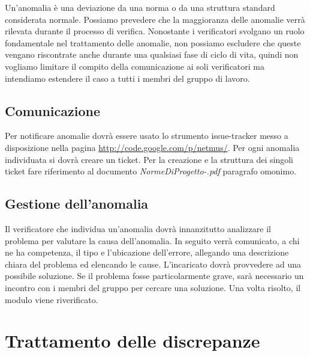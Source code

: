Un'anomalia \`e una deviazione da una norma o da una struttura standard
considerata normale. Possiamo prevedere che la maggioranza delle anomalie verr\`a 
rilevata durante il processo di verifica. Nonostante i verificatori svolgano un
ruolo fondamentale nel trattamento delle anomalie, non possiamo escludere che
queste vengano riscontrate anche durante una qualsiasi fase di ciclo di vita,
quindi non vogliamo limitare il compito della comunicazione ai soli verificatori ma 
intendiamo estendere il caso a tutti i membri del gruppo di lavoro.

\subsection{Comunicazione}

Per notificare anomalie dovr\`a essere usato lo strumento issue-tracker messo a
disposizione nella pagina \url{http://code.google.com/p/netmus/}. Per ogni
anomalia individuata si dovr\`a creare un ticket. Per la creazione e la struttura dei
singoli ticket fare riferimento al documento \emph{NormeDiProgetto-\versionenormeprogetto.pdf} paragrafo omonimo.


\subsection{Gestione dell'anomalia}

Il verificatore che individua un'anomalia dovr\`a innanzitutto analizzare il
problema per valutare la causa dell'anomalia.
In seguito verr\`a comunicato, a chi ne ha competenza, il tipo e l'ubicazione
dell'errore, allegando una descrizione chiara del problema ed elencando le
cause. L'incaricato dovr\`a provvedere ad una possibile soluzione. Se il
problema fosse particolarmente grave, sar\`a necessario un incontro con i membri 
del gruppo per cercare una soluzione. Una volta risolto, il modulo viene
riverificato.

\section{Trattamento delle discrepanze}

